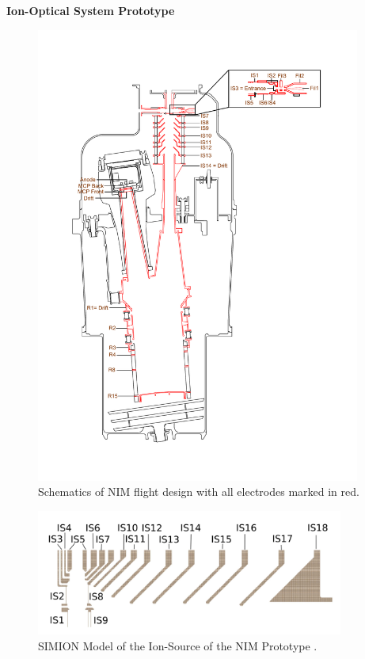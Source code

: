 		\textbf{Ion-Optical System Prototype}\\
		\begin{figure}[h]
			\centering
			\includegraphics[width= 0.95\textwidth]{Setup/NIM_schema.pdf}
			\caption{Schematics of NIM flight design with all electrodes marked in red.}
			\label{fig:MINPFMTot}
		\end{figure}
		
		
		\begin{figure}[h] %
			\centering
			\includegraphics[width= 0.9\textwidth]{Setup/Proto_IS_sim.png}
			\caption{SIMION Model of the Ion-Source of the NIM Prototype \cite{Diss_Meyer}.}
			\label{fig:SetupProtoISSim}
		\end{figure}
		
